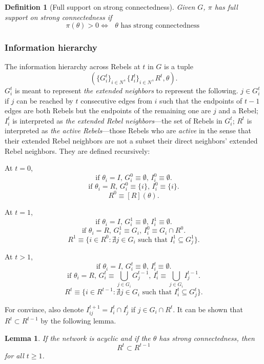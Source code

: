 \documentclass[12pt,letter]{article}
\newtheorem{lemma}{Lemma}[section]
\newtheorem{definition}{Definition}[section]
\theoremstyle{definition}
\theoremstyle{remark}
\theoremstyle{claim}
\begin{document}
\begin{definition}[Full support on strong connectedness]
Given $G$, $\pi$ has full support on strong connectedness if 
\[\pi(\theta)>0\Leftrightarrow \text{ $\theta$ has strong connectedness }\] 
\end{definition}  


\subsubsection{Information hierarchy}
\label{sec:info}
The information hierarchy across Rebels at $t$ in $G$ is a tuple \[(\{G^{t}_i\}_{i\in N}, \{I^{t}_i\}_{i\in N}, R^t,\theta).\]
$G^{t}_i$ is meant to represent \textit{the extended neighbors} to represent the following. $j\in G^{t}_i$ if $j$ can be reached by $t$ consecutive edges from $i$ such that the endpoints of $t-1$ edges are both Rebels but the endpoints of the remaining one are $j$ and a Rebel; $I^{t}_i$ is interpreted as \textit{the extended Rebel neighbors}---the set of Rebels in $G^t_i$; $R^t$ is interpreted as \textit{the active Rebels}---those Rebels who are \textit{active} in the sense that their extended Rebel neighbors are not a subset their direct neighbors' extended Rebel neighbors. They are defined recursively: 

At $t=0$,
\[\text{if $\theta_i=I$, $G^{0}_i\equiv \emptyset$, $I^{0}_i\equiv \emptyset$.}\] 
\[\text{if $\theta_i=R$, $G^{0}_i\equiv \{i\}$, $I^{0}_i\equiv \{i\}$.}\] 
\[\text{$R^0\equiv [R](\theta)$.}\] 

At $t=1$,
\[\text{if $\theta_i=I$, $G^{1}_i\equiv \emptyset$, $I^{1}_i\equiv \emptyset$.}\] 
\[\text{if $\theta_i=R$, $G^{1}_i\equiv G_i$, $I^{0}_i\equiv G_i\cap R^0$.}\] 
\[\text{$R^1\equiv \{i\in R^0: \nexists j\in G_i \text{ such that }I^1_i\subseteq G^1_j\}$.}\] 

At $t>1$, 
\[\text{if $\theta_i=I$, $G^{t}_i\equiv \emptyset$, $I^{t}_i\equiv \emptyset$.}\] 
\[\text{if $\theta_i=R$, $G^{t}_i\equiv \bigcup_{j\in G_i} G^{t-1}_j$, $I^{t}_i\equiv \bigcup_{j\in G_i} I^{t-1}_j$.}\] 
\[\text{$R^t\equiv \{i\in R^{t-1}: \nexists j\in G_i \text{ such that }I^t_i\subseteq G^t_j\}$.}\]



For convince, also denote $I^{t+1}_{ij}=I^t_i\cap I^t_j$ if $j\in G_i\cap R^{t}$. It can be shown that $R^t\subset R^{t-1}$ by the following lemma. 
\begin{lemma}
\label{lemma_inclusion}
If the network is acyclic and if the $\theta$ has strong connectedness, then 
\[R^t\subset R^{t-1}\] for all $t\geq 1$.
\end{lemma}
\end{document}
